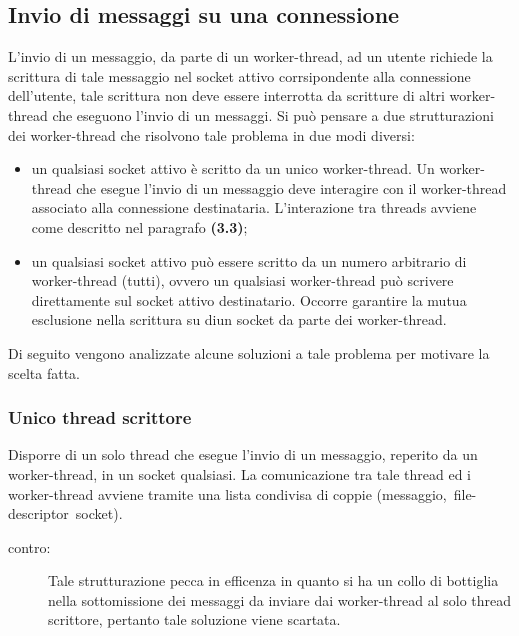 \documentclass[a4paper,10pt]{article}
\begin{document}
\subsection{Invio di messaggi su una connessione}
L'invio di un messaggio, da parte di un worker-thread, ad un utente
richiede la scrittura di tale messaggio nel socket attivo
corrsipondente alla connessione dell'utente, tale scrittura non deve
essere interrotta da scritture di altri worker-thread che eseguono
l'invio di un messaggi. Si pu\`o pensare a due strutturazioni dei
worker-thread che risolvono tale problema in due modi diversi:
\begin{itemize}
  \item un qualsiasi socket attivo \`e scritto da un unico
    worker-thread. Un worker-thread che esegue l'invio di un messaggio
    deve interagire con il worker-thread associato alla connessione
    destinataria. L'interazione tra threads avviene come descritto nel
    paragrafo \textbf{(3.3)};
  \item un qualsiasi socket attivo pu\`o essere scritto da un numero
    arbitrario di worker-thread (tutti), ovvero un qualsiasi
    worker-thread pu\`o scrivere direttamente sul socket attivo
    destinatario. Occorre garantire la mutua esclusione nella
    scrittura su diun socket da parte dei worker-thread.
\end{itemize}
Di seguito vengono analizzate alcune soluzioni a tale problema per
motivare la scelta fatta.

\subsubsection{Unico thread scrittore}
Disporre di un solo thread che esegue l'invio di un messaggio,
reperito da un worker-thread, in un socket qualsiasi. La comunicazione
tra tale thread ed i worker-thread avviene tramite una lista condivisa
di coppie (messaggio,~file-descriptor~socket).
\begin{description}
  \item[contro:] Tale strutturazione pecca in efficenza in quanto si
    ha un collo di bottiglia nella sottomissione dei messaggi da
    inviare dai worker-thread al solo thread scrittore, pertanto tale
    soluzione viene scartata.
\end{description}
\end{document}
